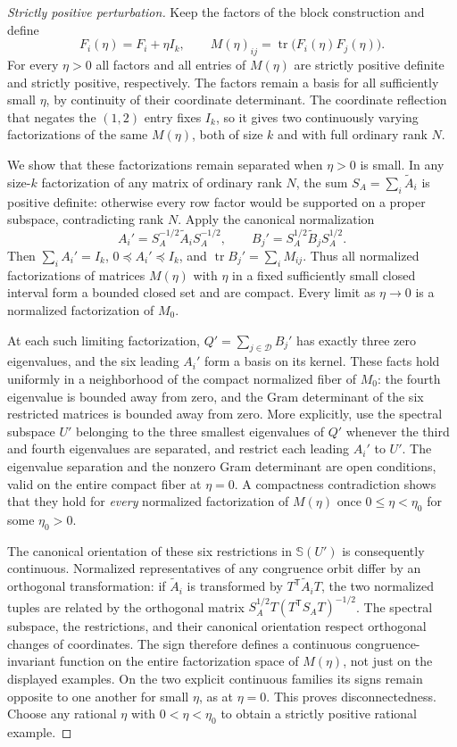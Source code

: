 \documentclass[11pt]{article}
\newcommand{\tr}{\operatorname{tr}}
\begin{document}
\begin{proof}[Strictly positive perturbation]
Keep the factors of the block construction and define
\[
 F_i(\eta)=F_i+\eta I_k,\qquad
 M(\eta)_{ij}=\tr\bigl(F_i(\eta)F_j(\eta)\bigr).
\]
For every $\eta>0$ all factors and all entries of $M(\eta)$ are strictly positive definite and strictly positive, respectively. The factors remain a basis for all sufficiently small $\eta$, by continuity of their coordinate determinant. The coordinate reflection that negates the $(1,2)$ entry fixes $I_k$, so it gives two continuously varying factorizations of the same $M(\eta)$, both of size $k$ and with full ordinary rank $N$.

We show that these factorizations remain separated when $\eta>0$ is small. In any size-$k$ factorization of any matrix of ordinary rank $N$, the sum $S_A=\sum_i\widetilde A_i$ is positive definite: otherwise every row factor would be supported on a proper subspace, contradicting rank $N$. Apply the canonical normalization
\[
 A_i'=S_A^{-1/2}\widetilde A_iS_A^{-1/2},\qquad
 B_j'=S_A^{1/2}\widetilde B_jS_A^{1/2}.
\]
Then $\sum_i A_i'=I_k$, $0\preceq A_i'\preceq I_k$, and $\tr B_j'=\sum_i M_{ij}$. Thus all normalized factorizations of matrices $M(\eta)$ with $\eta$ in a fixed sufficiently small closed interval form a bounded closed set and are compact. Every limit as $\eta\to0$ is a normalized factorization of $M_0$.

At each such limiting factorization, $Q'=\sum_{j\in\mathcal D}B_j'$ has exactly three zero eigenvalues, and the six leading $A_i'$ form a basis on its kernel. These facts hold uniformly in a neighborhood of the compact normalized fiber of $M_0$: the fourth eigenvalue is bounded away from zero, and the Gram determinant of the six restricted matrices is bounded away from zero. More explicitly, use the spectral subspace $U'$ belonging to the three smallest eigenvalues of $Q'$ whenever the third and fourth eigenvalues are separated, and restrict each leading $A_i'$ to $U'$. The eigenvalue separation and the nonzero Gram determinant are open conditions, valid on the entire compact fiber at $\eta=0$. A compactness contradiction shows that they hold for \emph{every} normalized factorization of $M(\eta)$ once $0\leq\eta<\eta_0$ for some $\eta_0>0$.

The canonical orientation of these six restrictions in $\mathbb S(U')$ is consequently continuous. Normalized representatives of any congruence orbit differ by an orthogonal transformation: if $\widetilde A_i$ is transformed by $T^{\mathsf T}\widetilde A_iT$, the two normalized tuples are related by the orthogonal matrix $S_A^{1/2}T(T^{\mathsf T}S_AT)^{-1/2}$. The spectral subspace, the restrictions, and their canonical orientation respect orthogonal changes of coordinates. The sign therefore defines a continuous congruence-invariant function on the entire factorization space of $M(\eta)$, not just on the displayed examples. On the two explicit continuous families its signs remain opposite to one another for small $\eta$, as at $\eta=0$. This proves disconnectedness. Choose any rational $\eta$ with $0<\eta<\eta_0$ to obtain a strictly positive rational example.
\end{proof}
\end{document}
